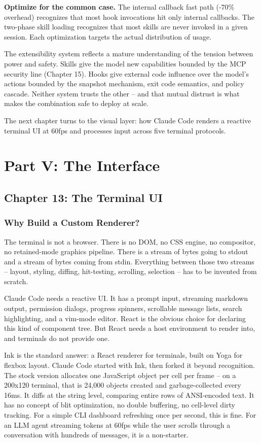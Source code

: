 \documentclass[
  english,
  11pt,
  letterpaper,
]{book}
\begin{document}
\textbf{Optimize for the common case.} The internal callback fast path
(-70\% overhead) recognizes that most hook invocations hit only internal
callbacks. The two-phase skill loading recognizes that most skills are
never invoked in a given session. Each optimization targets the actual
distribution of usage.

The extensibility system reflects a mature understanding of the tension
between power and safety. Skills give the model new capabilities bounded
by the MCP security line (Chapter 15). Hooks give external code
influence over the model's actions bounded by the snapshot mechanism,
exit code semantics, and policy cascade. Neither system trusts the other
-- and that mutual distrust is what makes the combination safe to deploy
at scale.

The next chapter turns to the visual layer: how Claude Code renders a
reactive terminal UI at 60fps and processes input across five terminal
protocols.

\part{Part V: The Interface}

\chapter{Chapter 13: The Terminal UI}\label{chapter-13-the-terminal-ui}

\section{Why Build a Custom
Renderer?}\label{why-build-a-custom-renderer}

The terminal is not a browser. There is no DOM, no CSS engine, no
compositor, no retained-mode graphics pipeline. There is a stream of
bytes going to stdout and a stream of bytes coming from stdin.
Everything between those two streams -- layout, styling, diffing,
hit-testing, scrolling, selection -- has to be invented from scratch.

Claude Code needs a reactive UI. It has a prompt input, streaming
markdown output, permission dialogs, progress spinners, scrollable
message lists, search highlighting, and a vim-mode editor. React is the
obvious choice for declaring this kind of component tree. But React
needs a host environment to render into, and terminals do not provide
one.

Ink is the standard answer: a React renderer for terminals, built on
Yoga for flexbox layout. Claude Code started with Ink, then forked it
beyond recognition. The stock version allocates one JavaScript object
per cell per frame -- on a 200x120 terminal, that is 24,000 objects
created and garbage-collected every 16ms. It diffs at the string level,
comparing entire rows of ANSI-encoded text. It has no concept of blit
optimization, no double buffering, no cell-level dirty tracking. For a
simple CLI dashboard refreshing once per second, this is fine. For an
LLM agent streaming tokens at 60fps while the user scrolls through a
conversation with hundreds of messages, it is a non-starter.
\end{document}
